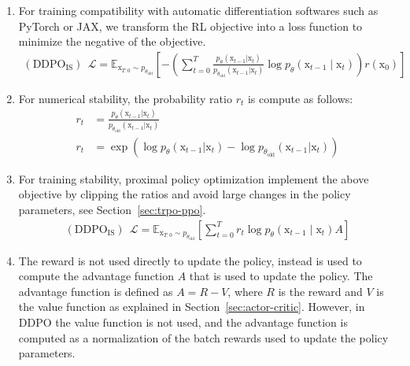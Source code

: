\begin{enumerate}
  \item For training compatibility with automatic differentiation softwares such as PyTorch or JAX, we transform the RL objective into a loss function to minimize the negative of the objective.
  \begin{equation*}
    \begin{split}
      (\text{DDPO}_{\text{IS}})~~ \mathcal{L} = \mathbb{E}_{\mathrm{x}_{T:0}\sim p_{\theta_{\text{old}}}} \left[-\left(\sum_{t=0}^{T}\frac{p_{\theta}(\mathrm{x}_{t-1}|\mathrm{x}_{t})}{p_{\theta_{\text{old}}}(\mathrm{x}_{t-1}|\mathrm{x}_{t})} \log p_{\theta}(\mathrm{x}_{t-1}\mid\mathrm{x}_{t})\right) r(\mathrm{x}_{0}) \right]
    \end{split}
  \end{equation*}
  \item For numerical stability, the probability ratio $r_{t}$ is compute as follows:
  \begin{equation*}
    \begin{split}
      r_{t} &= \frac{p_{\theta}(\mathrm{x}_{t-1}|\mathrm{x}_{t})}{p_{\theta_{\text{old}}}(\mathrm{x}_{t-1}|\mathrm{x}_{t})} \\
      r_{t} &= \exp(\log p_{\theta}(\mathrm{x}_{t-1}|\mathrm{x}_{t}) - \log p_{\theta_{\text{old}}}(\mathrm{x}_{t-1}|\mathrm{x}_{t}))
    \end{split}
  \end{equation*}
  \item For training stability, proximal policy optimization implement the above objective by clipping the ratios and avoid large changes in the policy parameters, see Section~\ref{sec:trpo-ppo}. 
  \begin{equation*}
    \begin{split}
      (\text{DDPO}_{\text{IS}})~~ \mathcal{L} =  \mathbb{E}_{\mathrm{x}_{T:0}\sim p_{\theta_{\text{old}}}} \left[ \sum_{t=0}^{T}r_{t} \log p_{\theta}(\mathrm{x}_{t-1}\mid \mathrm{x}_{t}) A \right]
    \end{split}
  \end{equation*}
  \item The reward is not used directly to update the policy, instead is used to compute the advantage function $A$ that is used to update the policy. 
  The advantage function is defined as $A = R - V$, where $R$ is the reward and $V$ is the value function as explained in Section~\ref{sec:actor-critic}. However, in DDPO the value function is not used, and the advantage function is computed as a normalization of the batch rewards used to update the policy
  parameters.
\end{enumerate}

